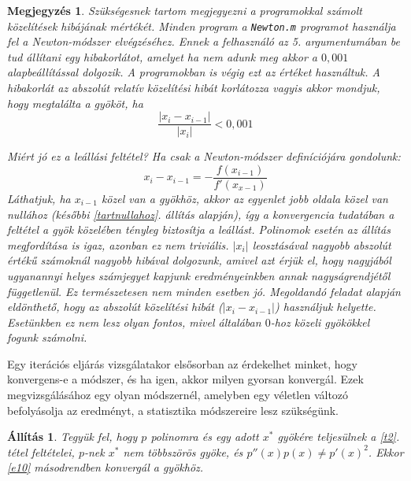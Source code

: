 \documentclass[a4paper,12pt]{report}
\newtheorem{All}[Tet]{Állítás}
\newtheorem{Megj}[Tet]{Megjegyzés}
\begin{document}
				  \begin{Megj}\label{pontossag}Szükségesnek tartom megjegyezni a programokkal számolt közelítések hibájának mértékét. Minden program a  \texttt{Newton.m} programot használja fel a Newton-módszer elvégzéséhez. Ennek a felhasználó az 5. argumentumában be tud állítani egy hibakorlátot, amelyet ha nem adunk meg akkor a $0,\!001$ alapbeállítással dolgozik. A programokban is végig ezt az értéket használtuk. A hibakorlát az abszolút relatív közelítési hibát korlátozza vagyis akkor mondjuk, hogy megtalálta a gyököt, ha\[\frac{|x_i-x_{i-1}|}{|x_i|}<0,\!001\]

Miért jó ez a leállási feltétel? Ha csak a Newton-módszer definíciójára gondolunk:\[x_i-x_{i-1}=-\frac{f(x_{i-1})}{f'(x_{x-1})}\]Láthatjuk, ha $x_{i-1}$ közel van a gyökhöz, akkor az egyenlet jobb oldala közel van nullához (későbbi \ref{tartnullahoz}. állítás alapján), így a konvergencia tudatában a feltétel a gyök közelében tényleg biztosítja a leállást. Polinomok esetén az állítás megfordítása is igaz, azonban ez nem triviális. $|x_i|$ leosztásával nagyobb abszolút értékű számoknál nagyobb hibával dolgozunk, amivel azt érjük el, hogy nagyjából ugyanannyi helyes számjegyet kapjunk eredményeinkben annak nagyságrendjétől függetlenül. Ez természetesen nem minden esetben jó. Megoldandó feladat alapján eldönthető, hogy az abszolút közelítési hibát ($|x_i-x_{i-1}|$) használjuk helyette. Esetünkben ez nem lesz olyan fontos, mivel általában $0$-hoz közeli gyökökkel fogunk számolni.
				\end{Megj}
				Egy iterációs eljárás vizsgálatakor elsősorban az érdekelhet minket, hogy konvergens-e a módszer, és ha igen, akkor milyen gyorsan konvergál. Ezek megvizsgálásához egy olyan módszernél, amelyben egy véletlen változó befolyásolja az eredményt, a statisztika módszereire lesz szükségünk.
				\begin{All}
					Tegyük fel, hogy $p$ polinomra és egy adott $x^*$ gyökére teljesülnek a \ref{t2}. tétel feltételei, $p$-nek $x^*$ nem többszörös gyöke, és $p''(x)p(x)\neq p'(x)^2$. Ekkor \ref{e10} másodrendben konvergál a gyökhöz.
				\end{All}
















\end{document}
